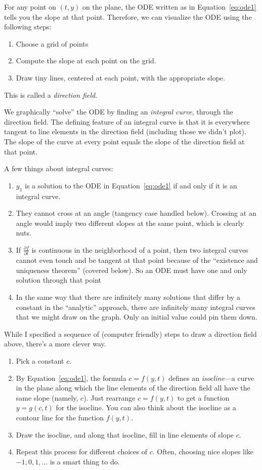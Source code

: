\documentclass[12pt]{article}
\theoremstyle{plain}
\theoremstyle{definition}
\theoremstyle{remark}
\begin{document}
For any point on $(t,y)$ on the plane, the ODE written as in
Equation~\ref{eq:ode1} tells you the slope at that point. Therefore, we
can visualize the ODE using the following steps:
\begin{enumerate}
  \item Choose a grid of points
  \item Compute the slope at each point on the grid.
  \item Draw tiny lines, centered at each point, with the appropriate
    slope.
\end{enumerate}
This is called a \emph{direction field}.

We graphically ``solve'' the ODE by finding an \emph{integral curve},
through the direction field. The defining feature of an integral curve
is that it is everywhere tangent to line elements in the direction field
(including those we didn't plot). The slope of the curve at every point
equals the slope of the direction field at that point.

A few things about integral curves:
\begin{enumerate}
  \item $y_1$ is a solution to the ODE in Equation~\ref{eq:ode1} if and
    only if it is an integral curve.
  \item They cannot cross at an angle (tangency case handled below).
    Crossing at an angle would imply two different slopes at the same
    point, which is clearly nuts.
  \item If $\frac{\partial f}{\partial t}$ is continuous in the
    neighborhood of a point, then two integral curves cannot even touch
    and be tangent  at that point because of the ``existence and
    uniqueness theorem'' (covered below). So an ODE must have one and
    only solution through that point
  \item In the same way that there are infinitely many solutions that
    differ by a constant in the ``analytic'' approach, there are
    infinitely many integral curves that we might draw on the graph.
    Only an initial value could pin them down.
\end{enumerate}
While I specified a sequence of (computer friendly) steps to draw a
direction field above, there's a more clever way.
\begin{enumerate}
  \item Pick a constant $c$.
  \item By Equation~\ref{eq:ode1}, the formula $c=f(y,t)$ defines an
    \emph{isocline}---a curve in the plane along which the line elements
    of the direction field all have the same slope (namely, $c$).
    Just rearrange $c=f(y,t)$ to get a function $y=g(c,t)$ for the
    isocline. You can also think about the isocline as a contour line
    for the function $f(y,t)$.
  \item Draw the isocline, and along that isocline, fill in line
    elements of slope $c$.
  \item Repeat this process for different choices of $c$. Often,
    choosing nice slopes like $-1,0,1,\ldots$ is a smart thing to do.
\end{enumerate}
\end{document}
